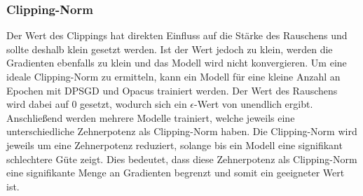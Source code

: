 \subsubsection*{Clipping-Norm}
Der Wert des Clippings hat direkten Einfluss auf die Stärke des Rauschens und sollte deshalb klein gesetzt werden.
Ist der Wert jedoch zu klein, werden die Gradienten ebenfalls zu klein und das Modell wird nicht konvergieren.
Um eine ideale Clipping-Norm zu ermitteln, kann ein Modell für eine kleine Anzahl an Epochen mit DPSGD und Opacus trainiert werden. 
Der Wert des Rauschens wird dabei auf 0 gesetzt, wodurch sich ein $\epsilon$-Wert von unendlich ergibt.
Anschließend werden mehrere Modelle trainiert, welche jeweils eine unterschiedliche Zehnerpotenz als Clipping-Norm haben.
Die Clipping-Norm wird jeweils um eine Zehnerpotenz reduziert, solange bis ein Modell eine signifikant schlechtere Güte zeigt.
Dies bedeutet, dass diese Zehnerpotenz als Clipping-Norm eine signifikante Menge an Gradienten begrenzt und somit ein geeigneter Wert ist.

